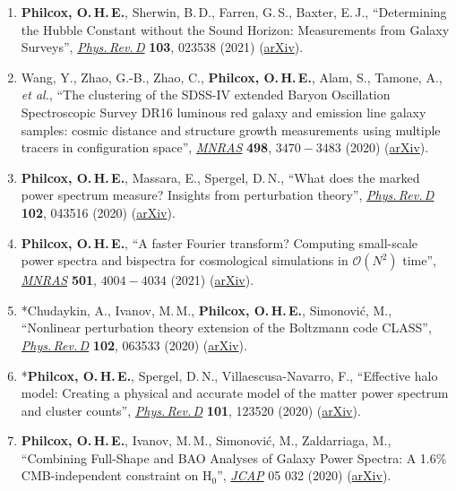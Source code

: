 \begin{enumerate}
    \item \textbf{Philcox, O.\,H.\,E.}, Sherwin, B.\,D., Farren, G.\,S., Baxter, E.\,J., ``Determining the Hubble Constant without the Sound Horizon: Measurements from Galaxy Surveys'', \href{https://doi.org/10.1103/PhysRevD.103.023538}{\textit{Phys.\,Rev.\,D}} \textbf{103}, 023538 (2021) (\href{https://arxiv.org/abs/2008.08084}{arXiv}).
    \item Wang, Y., Zhao, G.-B., Zhao, C., \textbf{Philcox, O.\,H.\,E.}, Alam, S., Tamone, A., \textit{et al.}, ``The clustering of the SDSS-IV extended Baryon Oscillation Spectroscopic Survey DR16 luminous red galaxy and emission line galaxy samples: cosmic distance and structure growth measurements using multiple tracers in configuration space'', \href{https://doi.org/10.1093/mnras/staa2593}{\textit{MNRAS}} \textbf{498}, $3470-3483$ (2020) (\href{https://arxiv.org/abs/2007.09010}{arXiv}).
    \item \textbf{Philcox, O.\,H.\,E.}, Massara, E., Spergel, D.\,N., ``What does the marked power spectrum measure? Insights from perturbation theory'', \href{https://doi.org/10.1103/PhysRevD.102.043516}{\textit{Phys.\,Rev.\,D}} \textbf{102}, 043516 (2020) (\href{https://arxiv.org/abs/2006.10055}{arXiv}).
    \item \textbf{Philcox, O.\,H.\,E.}, ``A faster Fourier transform? Computing small-scale power spectra and bispectra for cosmological simulations in $\mathcal{O}(N^2)$ time'', \href{https://doi.org/10.1093/mnras/staa3882}{\textit{MNRAS}} \textbf{501}, $4004-4034$ (2021) (\href{https://arxiv.org/abs/2005.01739}{arXiv}).
    \item *Chudaykin, A., Ivanov, M.\,M., \textbf{Philcox, O.\,H.\,E.}, Simonovi\'c, M., ``Nonlinear perturbation theory extension of the Boltzmann code CLASS'', \href{https://doi.org/10.1103/PhysRevD.102.063533}{\textit{Phys.\,Rev.\,D}} \textbf{102}, 063533 (2020) (\href{https://arxiv.org/abs/2004.10607}{arXiv}).
    \item *\textbf{Philcox, O.\,H.\,E.}, Spergel, D.\,N., Villaescusa-Navarro, F., ``Effective halo model: Creating a physical and accurate model of the matter power spectrum and cluster counts'', \href{https://doi.org/10.1103/PhysRevD.101.123520}{\textit{Phys.\,Rev.\,D}} \textbf{101}, 123520 (2020) (\href{https://arxiv.org/abs/2004.09515}{arXiv}).
    \item \textbf{Philcox, O.\,H.\,E.}, Ivanov, M.\,M., Simonovi\'c, M., Zaldarriaga, M., ``Combining Full-Shape and BAO Analyses of Galaxy Power Spectra: A 1.6\% CMB-independent constraint on H$_0$'', \href{https://doi.org/10.1088/1475-7516/2020/05/032}{\textit{JCAP}} 05 032 (2020) (\href{https://arxiv.org/abs/2002.04035}{arXiv}).

\end{enumerate}
